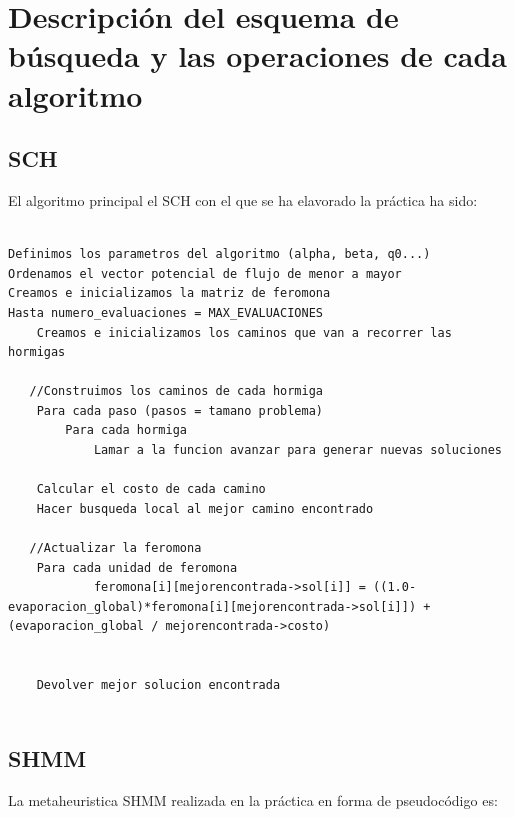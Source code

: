 \newpage		
\section{Descripción del esquema de búsqueda y las operaciones de cada algoritmo}	
		
		\subsection{SCH}
		
		El algoritmo principal el SCH con el que se ha elavorado la práctica ha sido:
		
	\begin{lstlisting}[language=SH]
					
Definimos los parametros del algoritmo (alpha, beta, q0...)
Ordenamos el vector potencial de flujo de menor a mayor
Creamos e inicializamos la matriz de feromona
Hasta numero_evaluaciones = MAX_EVALUACIONES
	Creamos e inicializamos los caminos que van a recorrer las hormigas
	
   //Construimos los caminos de cada hormiga
    Para cada paso (pasos = tamano problema)
		Para cada hormiga
			Lamar a la funcion avanzar para generar nuevas soluciones

    Calcular el costo de cada camino
	Hacer busqueda local al mejor camino encontrado
	
   //Actualizar la feromona 
    Para cada unidad de feromona
            feromona[i][mejorencontrada->sol[i]] = ((1.0-evaporacion_global)*feromona[i][mejorencontrada->sol[i]]) + (evaporacion_global / mejorencontrada->costo)


    Devolver mejor solucion encontrada


	\end{lstlisting}
	
	
		\newpage
		\subsection{SHMM}
		La metaheuristica SHMM realizada en la práctica en forma de pseudocódigo es:
		
